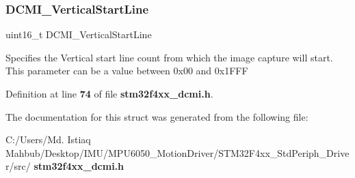 \subsubsection{D\+C\+M\+I\+\_\+\+Vertical\+Start\+Line}
{\footnotesize\ttfamily uint16\+\_\+t D\+C\+M\+I\+\_\+\+Vertical\+Start\+Line}

Specifies the Vertical start line count from which the image capture will start. This parameter can be a value between 0x00 and 0x1\+F\+FF 

Definition at line \textbf{ 74} of file \textbf{ stm32f4xx\+\_\+dcmi.\+h}.



The documentation for this struct was generated from the following file\+:\begin{DoxyCompactItemize}
\item 
C\+:/\+Users/\+Md. Istiaq Mahbub/\+Desktop/\+I\+M\+U/\+M\+P\+U6050\+\_\+\+Motion\+Driver/\+S\+T\+M32\+F4xx\+\_\+\+Std\+Periph\+\_\+\+Driver/src/\textbf{ stm32f4xx\+\_\+dcmi.\+h}\end{DoxyCompactItemize}
